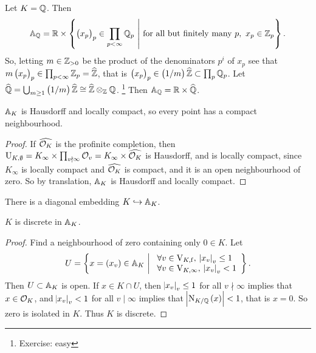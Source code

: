 \begin{example*}
Let $ K = \QQ $. Then
$$ \AA_\QQ = \RR \times \cbr{\br{x_p}_p \in \prod_{p < \infty} \QQ_p \st \text{for all but finitely many} \ p, \ x_p \in \ZZ_p}. $$
So, letting $ m \in \ZZ_{> 0} $ be the product of the denominators $ p^i $ of $ x_p $ see that $ m\br{x_p}_p \in \prod_{p < \infty} \ZZ_p = \widehat{\ZZ} $, that is $ \br{x_p}_p \in \br{1 / m}\widehat{\ZZ} \subset \prod_p \QQ_p $. Let $ \widehat{\QQ} = \bigcup_{m \ge 1} \br{1 / m}\widehat{\ZZ} \cong \widehat{\ZZ} \otimes_\ZZ \QQ $. \footnote{Exercise: easy} Then $ \AA_\QQ = \RR \times \widehat{\QQ} $.
\end{example*}

\begin{proposition}
$ \AA_K $ is Hausdorff and locally compact, so every point has a compact neighbourhood.
\end{proposition}

\begin{proof}
If $ \widehat{\OOO_K} $ is the profinite completion, then $ \U_{K, \emptyset} = K_\infty \times \prod_{v \nmid \infty} \OOO_v = K_\infty \times \widehat{\OOO_K} $ is Hausdorff, and is locally compact, since $ K_\infty $ is locally compact and $ \widehat{\OOO_K} $ is compact, and it is an open neighbourhood of zero. So by translation, $ \AA_K $ is Hausdorff and locally compact.
\end{proof}

There is a diagonal embedding $ K \hookrightarrow \AA_K $.

\begin{proposition}
$ K $ is discrete in $ \AA_K $.
\end{proposition}

\begin{proof}
Find a neighbourhood of zero containing only $ 0 \in K $. Let
$$ U = \cbr{x = \br{x_v} \in \AA_K \st \begin{array}{l} \forall v \in \V_{K, \f}, \ \abs{x_v}_v \le 1 \\ \forall v \in \V_{K, \infty}, \ \abs{x_v}_v < 1 \end{array}}. $$
Then $ U \subset \AA_K $ is open. If $ x \in K \cap U $, then $ \abs{x_v}_v \le 1 $ for all $ v \nmid \infty $ implies that $ x \in \OOO_K $, and $ \abs{x_v}_v < 1 $ for all $ v \mid \infty $ implies that $ \abs{\N_{K / \QQ}\br{x}} < 1 $, that is $ x = 0 $. So zero is isolated in $ K $. Thus $ K $ is discrete.
\end{proof}

